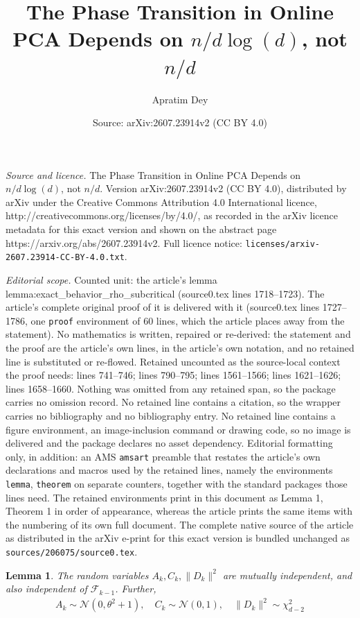 \documentclass[10pt,a4paper]{amsart}
\title{The Phase Transition in Online PCA Depends on $n/d\log(d)$, not $n/d$}
\author{Apratim Dey}
\date{Source: arXiv:2607.23914v2 (CC BY 4.0)}
\newtheorem{lemma}{Lemma}
\def\gF{{\mathcal{F}}}
\def\gN{{\mathcal{N}}}
\begin{document}
\maketitle

\noindent\emph{Source and licence.} The Phase Transition in Online PCA Depends on $n/d\log(d)$, not $n/d$. Version arXiv:2607.23914v2 (CC BY 4.0), distributed by arXiv under the Creative Commons Attribution 4.0 International licence, http://creativecommons.org/licenses/by/4.0/, as recorded in the arXiv licence metadata for this exact version and shown on the abstract page https://arxiv.org/abs/2607.23914v2. Full licence notice: \texttt{licenses/arxiv-2607.23914-CC-BY-4.0.txt}.\par\smallskip

\noindent\textit{Editorial scope.} Counted unit: the article's lemma lemma:exact\_behavior\_rho\_subcritical (source0.tex lines 1718--1723). The article's complete original proof of it is delivered with it (source0.tex lines 1727--1786, one \texttt{proof} environment of 60 lines, which the article places away from the statement). No mathematics is written, repaired or re-derived: the statement and the proof are the article's own lines, in the article's own notation, and no retained line is substituted or re-flowed.  Retained uncounted as the source-local context the proof needs: lines 741--746; lines 790--795; lines 1561--1566; lines 1621--1626; lines 1658--1660.  Nothing was omitted from any retained span, so the package carries no omission record.  No retained line contains a citation, so the wrapper carries no bibliography and no bibliography entry.  No retained line contains a figure environment, an image-inclusion command or drawing code, so no image is delivered and the package declares no asset dependency.  Editorial formatting only, in addition: an AMS \texttt{amsart} preamble that restates the article's own declarations and macros used by the retained lines, namely the environments \texttt{lemma}, \texttt{theorem} on separate counters, together with the standard packages those lines need.  The retained environments print in this document as Lemma 1, Theorem 1 in order of appearance, whereas the article prints the same items with the numbering of its own full document.  The complete native source of the article as distributed in the arXiv e-print for this exact version is bundled unchanged as \texttt{sources/206075/source0.tex}.
\begin{lemma}\label{lemma:Xk_components_indep}
The random variables $A_k, C_k, \|D_k\|^2$ are mutually independent, and also independent of $\gF_{k-1}$. Further,
\begin{align*}
    A_k\sim \gN(0,\theta^2+1), \quad C_k\sim \gN(0,1),\quad \|D_k\|^2\sim \chi^2_{d-2}
\end{align*}
\end{lemma}
\end{document}
